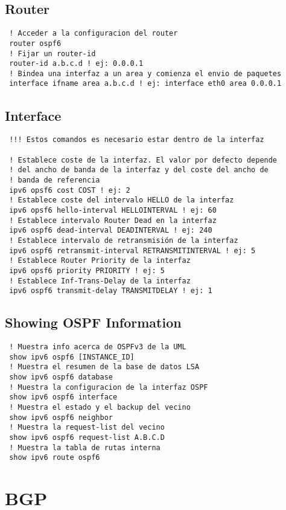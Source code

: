 \documentclass{article}
\begin{document}
\subsection{Router}
\begin{verbatim}
 ! Acceder a la configuracion del router
 router ospf6
 ! Fijar un router-id
 router-id a.b.c.d ! ej: 0.0.0.1
 ! Bindea una interfaz a un area y comienza el envio de paquetes
 interface ifname area a.b.c.d ! ej: interface eth0 area 0.0.0.1
\end{verbatim}

\subsection{Interface}
\begin{verbatim}
 !!! Estos comandos es necesario estar dentro de la interfaz

 ! Establece coste de la interfaz. El valor por defecto depende
 ! del ancho de banda de la interfaz y del coste del ancho de
 ! banda de referencia
 ipv6 opsf6 cost COST ! ej: 2
 ! Establece coste del intervalo HELLO de la interfaz
 ipv6 opsf6 hello-interval HELLOINTERVAL ! ej: 60
 ! Establece intervalo Router Dead en la interfaz
 ipv6 ospf6 dead-interval DEADINTERVAL ! ej: 240
 ! Establece intervalo de retransmisión de la interfaz
 ipv6 ospf6 retransmit-interval RETRANSMITINTERVAL ! ej: 5
 ! Establece Router Priority de la interfaz
 ipv6 opsf6 priority PRIORITY ! ej: 5
 ! Establece Inf-Trans-Delay de la interfaz
 ipv6 ospf6 transmit-delay TRANSMITDELAY ! ej: 1
\end{verbatim}

\subsection{Showing OSPF Information}
\begin{verbatim}
 ! Muestra info acerca de OSPFv3 de la UML
 show ipv6 ospf6 [INSTANCE_ID]
 ! Muestra el resumen de la base de datos LSA
 show ipv6 ospf6 database
 ! Muestra la configuracion de la interfaz OSPF
 show ipv6 ospf6 interface
 ! Muestra el estado y el backup del vecino
 show ipv6 ospf6 neighbor
 ! Muestra la request-list del vecino
 show ipv6 ospf6 request-list A.B.C.D
 ! Muestra la tabla de rutas interna
 show ipv6 route ospf6
\end{verbatim}

\section{BGP}
\end{document}
